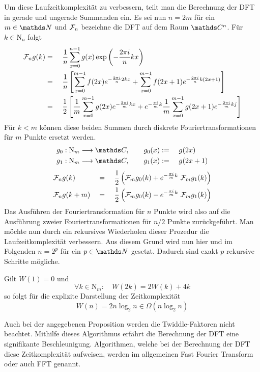 			Um diese Laufzeitkomplexität zu verbessern, teilt man die Berechnung der DFT in gerade und ungerade Summanden ein.
			Es sei nun $n=2m$ für ein $m\in\SN$ und $\mathcal{F}_n$ bezeichne die DFT auf dem Raum $\SC^n$.
			Für $k\in\mathrm{N}_n$ folgt
			\begin{alignat*}{3}
				\mathcal{F}_ng(k) &=&& \ \frac{1}{n}\sum_{x=0}^{n-1} g(x)\exp\left(  -\frac{2\pi i}{n}kx  \right) \\
				&=&& \ \frac{1}{n} \left[  \sum_{x=0}^{m-1} f(2x)e^{-\frac{2\pi i}{n}2kx} + \sum_{x=0}^{m-1} f(2x+1)e^{-\frac{2\pi i}{n}k(2x+1)}  \right] \\
				&=&& \ \frac{1}{2}\left[ \frac{1}{m} \sum_{x=0}^{m-1} g(2x)e^{-\frac{2\pi i}{m}kx} + e^{-\frac{\pi i}{m}k} \frac{1}{m} \sum_{x=0}^{m-1} g(2x+1)e^{-\frac{2\pi i}{m}kj} \right]
			\end{alignat*}
			Für $k<m$ können diese beiden Summen durch diskrete Fouriertransformationen für $m$ Punkte ersetzt werden.
			\begin{alignat*}{3}
				g_0:\mathrm{N}_m\longrightarrow\SC,\qquad g_0(x) &:=&& \ g(2x) \\
				g_1:\mathrm{N}_m\longrightarrow\SC,\qquad g_1(x) &:=&& \ g(2x+1)
			\end{alignat*}
			\begin{alignat*}{5}
				&\FF_n g(k) &&=&& \ \frac{1}{2}\curvb{\FF_m g_0(k) + e^{-\frac{\pi i}{m}k} \ \FF_m g_1(k)} \\
				&\FF_n g(k+m) &&=&& \ \frac{1}{2}\curvb{\FF_m g_0(k) - e^{-\frac{\pi i}{m}k} \ \FF_m g_1(k)}
			\end{alignat*}
			Das Ausführen der Fouriertransformation für $n$ Punkte wird also auf die Ausführung zweier Fouriertransformationen für $n/2$ Punkte zurückgeführt.
			Man möchte nun durch ein rekursives Wiederholen dieser Prozedur die Laufzeitkomplexität verbessern.
			Aus diesem Grund wird nun hier und im Folgenden $n=2^p$ für ein $p\in\SN$ gesetzt.
			Dadurch sind exakt $p$ rekursive Schritte mögliche.

			\begin{proposition*}[Zeitkomplexität]
				Gilt $W(1)=0$ und
				\[ \forall k\in\mathrm{N}_m:\quad W(2k) = 2W(k) + 4k \]
				so folgt für die explizite Darstellung der Zeitkomplexität
				\[ W(n) = 2n\log_2n \in \Omega(n\log_2n) \]
			\end{proposition*}

			Auch bei der angegebenen Proposition werden die Twiddle-Faktoren nicht beachtet.			
			Mithilfe dieses Algorithmus erfährt die Berechnung der DFT eine signifikante Beschleunigung.
			Algorithmen, welche bei der Berechnung der DFT diese Zeitkomplexität aufweisen, werden im allgemeinen Fast Fourier Transform oder auch FFT genannt.

